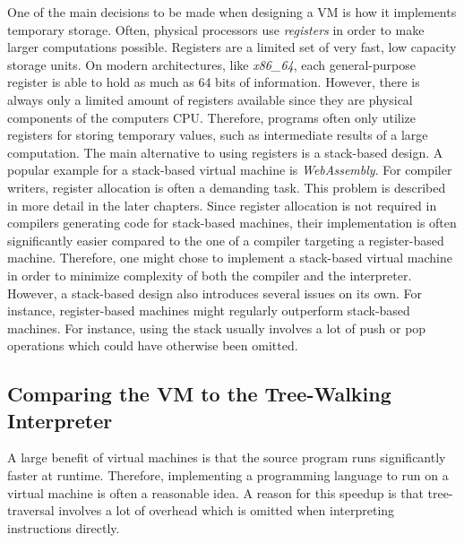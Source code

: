 One of the main decisions to be made when designing a VM is how it implements temporary storage.
Often, physical processors use \emph{registers} in order to make larger computations possible.
Registers are a limited set of very fast, low capacity storage units.
On modern architectures, like \emph{x86\_64}, each general-purpose register is able to hold as much as 64 bits of information.
However, there is always only a limited amount of registers available since they are physical components of the computers CPU.
Therefore, programs often only utilize registers for storing temporary values, such as intermediate results of a large computation.
The main alternative to using registers is a stack-based design.
A popular example for a stack-based virtual machine is \emph{WebAssembly}.
For compiler writers, register allocation is often a demanding task.
This problem is described in more detail in the later chapters. %
Since register allocation is not required in compilers generating code for stack-based machines, their implementation is often significantly easier compared to the one  of a compiler targeting a register-based machine.
Therefore, one might chose to implement a stack-based virtual machine in order to minimize complexity of both the compiler and the interpreter.
However, a stack-based design also introduces several issues on its own.
For instance, register-based machines might regularly outperform stack-based machines.
For instance, using the stack usually involves a lot of push or pop operations which could have otherwise been omitted.

\subsection{Comparing the VM to the Tree-Walking Interpreter}
A large benefit of virtual machines is that the source program runs significantly faster at runtime.
Therefore, implementing a programming language to run on a virtual machine is often a reasonable idea.
A reason for this speedup is that tree-traversal involves a lot of overhead which is omitted when interpreting instructions directly.

